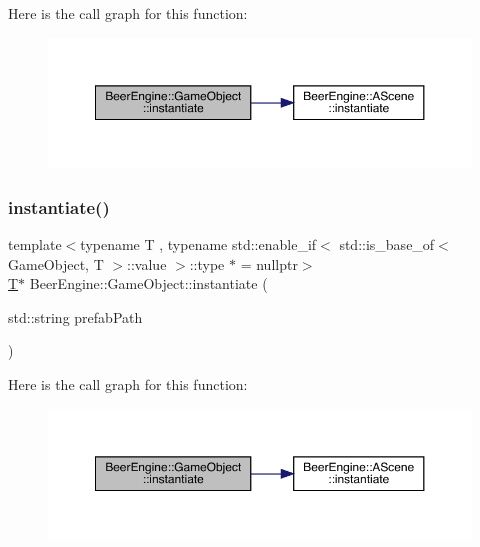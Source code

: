 Here is the call graph for this function\+:
\nopagebreak
\begin{figure}[H]
\begin{center}
\leavevmode
\includegraphics[width=350pt]{class_beer_engine_1_1_game_object_ab88b7ff5e8aab52e54c02f9d103bbfcf_cgraph}
\end{center}
\end{figure}
\mbox{\label{class_beer_engine_1_1_game_object_ad523cd5783c0bfda02a9077af646e25b}} 
\subsubsection{\texorpdfstring{instantiate()}{instantiate()}\hspace{0.1cm}{\footnotesize\ttfamily [2/2]}}
{\footnotesize\ttfamily template$<$typename T , typename std\+::enable\+\_\+if$<$ std\+::is\+\_\+base\+\_\+of$<$ Game\+Object, T $>$\+::value $>$\+::type $\ast$  = nullptr$>$ \\
\mbox{\hyperlink{namespace_beer_engine_a94f0b552f6dc910de8cdb44207981f53a8de48e594408f9fc561b2f68ce05f664}{T}}$\ast$ Beer\+Engine\+::\+Game\+Object\+::instantiate (\begin{DoxyParamCaption}\item[{std\+::string}]{prefab\+Path }\end{DoxyParamCaption})\hspace{0.3cm}{\ttfamily [inline]}}

Here is the call graph for this function\+:
\nopagebreak
\begin{figure}[H]
\begin{center}
\leavevmode
\includegraphics[width=350pt]{class_beer_engine_1_1_game_object_ad523cd5783c0bfda02a9077af646e25b_cgraph}
\end{center}
\end{figure}
\mbox{\label{class_beer_engine_1_1_game_object_a826c9b7b4077db777e3cf563c1d0328e}} 
